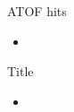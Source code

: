 \documentclass[10pt,aspectratio=43]{beamer}
\begin{document}
\begin{frame}{ATOF hits}
    \begin{itemize}
        \item 
    \end{itemize}

    \vspace{0.5cm}

\end{frame}

\begin{frame}{Title}
    \begin{itemize}
        \item 
    \end{itemize}

    \vspace{0.5cm}

\end{frame}
\end{document}
